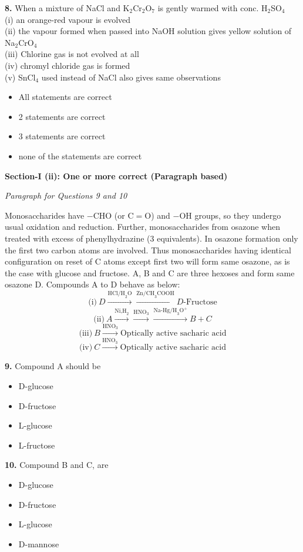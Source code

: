 \documentclass[10pt,twocolumn]{extarticle}
\newenvironment{qoptions}{\begin{itemize}[leftmargin=1.8em,itemsep=2pt,topsep=2pt,label={}]}{\end{itemize}}
\newcommand{\opt}[2]{\item[({#1})] {#2}}
\newcommand{\subsectionhdr}[1]{\par\vspace{3pt}\noindent\textbf{#1}\par\vspace{2pt}}
\begin{document}
\textbf{8.} When a mixture of NaCl and K$_2$Cr$_2$O$_7$ is gently warmed with conc. H$_2$SO$_4$\\
(i) an orange-red vapour is evolved\\
(ii) the vapour formed when passed into NaOH solution gives yellow solution of Na$_2$CrO$_4$\\
(iii) Chlorine gas is not evolved at all\\
(iv) chromyl chloride gas is formed\\
(v) SnCl$_4$ used instead of NaCl also gives same observations

\begin{qoptions}
\opt{A}{All statements are correct}
\opt{B}{2 statements are correct}
\opt{C}{3 statements are correct}
\opt{D}{none of the statements are correct}
\end{qoptions}

\subsectionhdr{Section-I (ii): One or more correct (Paragraph based)}

\textit{Paragraph for Questions 9 and 10}

Monosaccharides have $-$CHO (or C$=$O) and $-$OH groups, so they undergo usual oxidation and reduction. Further, monosaccharides from osazone when treated with excess of phenylhydrazine (3 equivalents). In osazone formation only the first two carbon atoms are involved. Thus monosaccharides having identical configuration on reset of C atoms except first two will form same osazone, as is the case with glucose and fructose. A, B and C are three hexoses and form same osazone D. Compounds A to D behave as below:
\[\text{(i)}\ D\xrightarrow{\text{HCl/H}_2\text{O}}\xrightarrow{\text{Zn/CH}_3\text{COOH}}D\text{-Fructose}\]
\[\text{(ii)}\ A\xrightarrow{\text{Ni,H}_2}\xrightarrow{\text{HNO}_3}\xrightarrow{\text{Na-Hg/H}_3\text{O}^+}B+C\]
\[\text{(iii)}\ B\xrightarrow{\text{HNO}_3}\text{Optically active sacharic acid}\]
\[\text{(iv)}\ C\xrightarrow{\text{HNO}_3}\text{Optically active sacharic acid}\]

\textbf{9.} Compound A should be

\begin{qoptions}
\opt{A}{D-glucose}
\opt{B}{D-fructose}
\opt{C}{L-glucose}
\opt{D}{L-fructose}
\end{qoptions}

\textbf{10.} Compound B and C, are

\begin{qoptions}
\opt{A}{D-glucose}
\opt{B}{D-fructose}
\opt{C}{L-glucose}
\opt{D}{D-mannose}
\end{qoptions}
\end{document}
